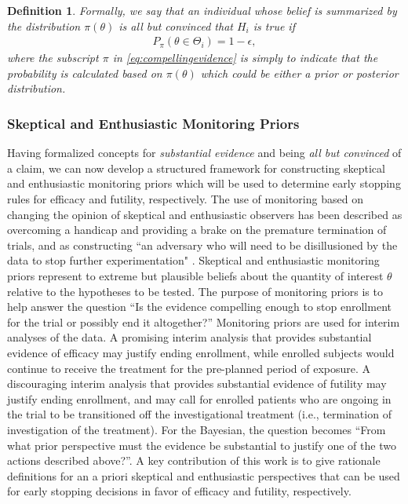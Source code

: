 \documentclass[12pt]{article}
\newtheorem{mydef}{Definition}
\begin{document}
\begin{mydef}
Formally, we say that an individual whose belief is summarized by the distribution $\pi\left(\theta\right)$ is \textit{all but convinced} that $H_i$ is true if 
\begin{align}\label{eq:compellingevidence}
		P_\pi(\theta\in\Theta_i)= 1-\epsilon,
\end{align} 
where the subscript $\pi$ in \eqref{eq:compellingevidence} is simply to indicate that the probability is calculated based on $\pi\left(\theta\right)$ which could be either a prior
or posterior distribution.
\end{mydef}

\subsubsection{Skeptical and Enthusiastic Monitoring Priors}\label{sec:MP}
Having formalized concepts for \textit{substantial evidence} and  being \textit{all but convinced} of a claim, 
we can now develop a structured framework for constructing skeptical and enthusiastic monitoring priors which will be used to 
determine early stopping rules for efficacy and futility, respectively.
%
The use of monitoring based on changing the opinion of skeptical and enthusiastic observers has been described as overcoming a 
handicap \citep{Freedman1989} and providing a brake \citep{Fayers1997} on the premature termination of trials, and as 
constructing ``an adversary who will need to be disillusioned by the data to stop further experimentation" \citep{Spiegelhalter1994}. 
%
Skeptical and enthusiastic monitoring priors represent to extreme but plausible beliefs about the quantity of interest $\theta$ relative to the hypotheses to be tested.
%
The purpose of monitoring priors is to help answer the question ``Is the evidence compelling enough to stop enrollment for the trial or possibly end it altogether?''
%
Monitoring priors are used for interim analyses of the data. 
A promising interim analysis that provides substantial evidence of efficacy may justify ending enrollment, while enrolled subjects would continue 
to receive the treatment for the pre-planned period of exposure. 
%
A discouraging interim analysis that provides substantial evidence of futility may justify ending enrollment, and may call for enrolled patients 
who are ongoing in the trial to be transitioned off the investigational treatment (i.e., termination of investigation of the treatment). 
%
For the Bayesian, the question becomes ``From what prior perspective must the evidence be substantial to justify one of the two actions described above?''.
%
A key contribution of this work is to give rationale definitions for an a priori skeptical and enthusiastic perspectives that can be used for early stopping decisions 
in favor of efficacy and futility, respectively.
\end{document}
